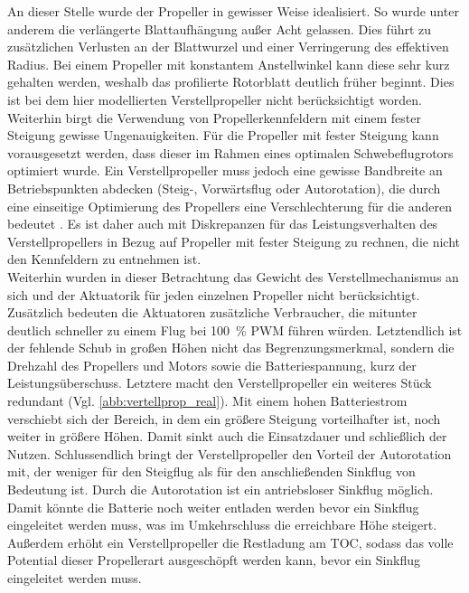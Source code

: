 An dieser Stelle wurde der Propeller in gewisser Weise idealisiert. So wurde unter anderem die verlängerte Blattaufhängung außer Acht gelassen. Dies führt zu zusätzlichen Verlusten an der Blattwurzel und einer Verringerung des effektiven Radius. Bei einem Propeller mit konstantem Anstellwinkel kann diese sehr kurz gehalten werden, weshalb das profilierte Rotorblatt deutlich früher beginnt. Dies ist bei dem hier modellierten Verstellpropeller nicht berücksichtigt worden. Weiterhin birgt die Verwendung von Propellerkennfeldern mit einem fester Steigung gewisse Ungenauigkeiten. Für die Propeller mit fester Steigung kann vorausgesetzt werden, dass dieser im Rahmen eines optimalen Schwebeflugrotors \cite[S.197-S.205]{Wall.2015} optimiert wurde. Ein Verstellpropeller muss jedoch eine gewisse Bandbreite an Betriebspunkten abdecken (Steig-, Vorwärtsflug oder Autorotation), die durch eine einseitige Optimierung des Propellers eine Verschlechterung für die anderen bedeutet \cite[S.203]{Wall.2015}. Es ist daher auch mit Diskrepanzen für das Leistungsverhalten des Verstellpropellers in Bezug auf Propeller mit fester Steigung zu rechnen, die nicht den Kennfeldern zu entnehmen ist. \\%
Weiterhin wurden in dieser Betrachtung das Gewicht des Verstellmechanismus an sich und der Aktuatorik für jeden einzelnen Propeller nicht berücksichtigt. Zusätzlich bedeuten die Aktuatoren zusätzliche Verbraucher, die mitunter deutlich schneller zu einem Flug bei \SI{100}{\%} PWM führen würden. Letztendlich ist der fehlende Schub in großen Höhen nicht das Begrenzungsmerkmal, sondern die Drehzahl des Propellers und Motors sowie die Batteriespannung, kurz der Leistungsüberschuss. Letztere macht den Verstellpropeller ein weiteres Stück redundant (Vgl. \ref{abb:vertellprop_real}). Mit einem hohen Batteriestrom verschiebt sich der Bereich, in dem ein größere Steigung vorteilhafter ist, noch weiter in größere Höhen. Damit sinkt auch die Einsatzdauer und schließlich der Nutzen. 
Schlussendlich bringt der Verstellpropeller den Vorteil der Autorotation mit, der weniger für den Steigflug als für den anschließenden Sinkflug von Bedeutung ist. Durch die Autorotation ist ein antriebsloser Sinkflug möglich. Damit könnte die Batterie noch weiter entladen werden bevor ein Sinkflug eingeleitet werden muss, was im Umkehrschluss die erreichbare Höhe steigert. Außerdem erhöht ein Verstellpropeller die Restladung am TOC, sodass das volle Potential dieser Propellerart ausgeschöpft werden kann, bevor ein Sinkflug eingeleitet werden muss. 

